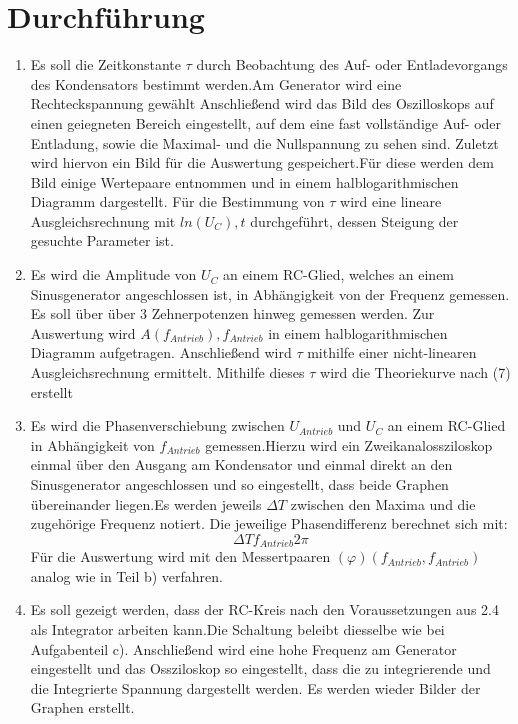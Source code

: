 \section{Durchführung}
\label{sec:Durchführung}
\renewcommand{\labelenumi}{\alph{enumi})}
\begin{enumerate}
  \item Es soll die Zeitkonstante $\tau$ durch Beobachtung des Auf- oder Entladevorgangs
  des Kondensators bestimmt werden.Am Generator wird eine Rechteckspannung gewählt
  Anschließend wird das Bild des Oszilloskops auf einen
  geiegneten Bereich eingestellt, auf dem eine fast vollständige Auf- oder Entladung, sowie
  die Maximal- und die Nullspannung zu sehen sind. Zuletzt wird hiervon ein Bild für die
  Auswertung gespeichert.Für diese werden dem Bild einige Wertepaare entnommen und in einem
  halblogarithmischen Diagramm dargestellt. Für die Bestimmung von $\tau$ wird eine
  lineare Ausgleichsrechnung mit ${ln(U_C), t}$ durchgeführt, dessen Steigung der gesuchte
  Parameter ist.

  \item Es wird die Amplitude von $U_C$ an einem RC-Glied, welches an einem Sinusgenerator
   angeschlossen ist, in Abhängigkeit von der Frequenz gemessen. Es soll über über
   3 Zehnerpotenzen hinweg gemessen werden. Zur Auswertung wird ${A(f_{Antrieb}), f_{Antrieb}}$
   in einem halblogarithmischen Diagramm aufgetragen. Anschließend wird $\tau$ mithilfe einer nicht-linearen
    Ausgleichsrechnung ermittelt. Mithilfe dieses $\tau$ wird die Theoriekurve nach (7) erstellt



    \item Es wird die Phasenverschiebung zwischen $U_{Antrieb}$ und $U_C$ an einem
    RC-Glied in Abhängigkeit von $f_{Antrieb}$ gemessen.Hierzu wird ein Zweikanalossziloskop
    einmal über den Ausgang am Kondensator und einmal direkt an den Sinusgenerator angeschlossen
     und so eingestellt, dass beide Graphen übereinander liegen.Es werden jeweils
      $\Delta T$ zwischen den Maxima und die zugehörige Frequenz notiert. Die jeweilige
       Phasendifferenz berechnet sich mit:
       \begin{equation}
         \Delta Tf_{Antrieb} 2 \pi
       \end{equation}
       Für die Auswertung wird mit den Messertpaaren ${(\varphi)(f_{Antrieb},f_{Antrieb}) }$
       analog wie in Teil b) verfahren.

       \item Es soll gezeigt werden, dass der RC-Kreis nach den Voraussetzungen aus 2.4 als
       Integrator arbeiten kann.Die Schaltung beleibt diesselbe wie bei Aufgabenteil c).
       Anschließend wird eine hohe Frequenz am Generator eingestellt und das Ossziloskop so eingestellt, dass
       die zu integrierende und die Integrierte Spannung dargestellt werden. Es werden wieder
       Bilder der Graphen erstellt.


\end{enumerate}
